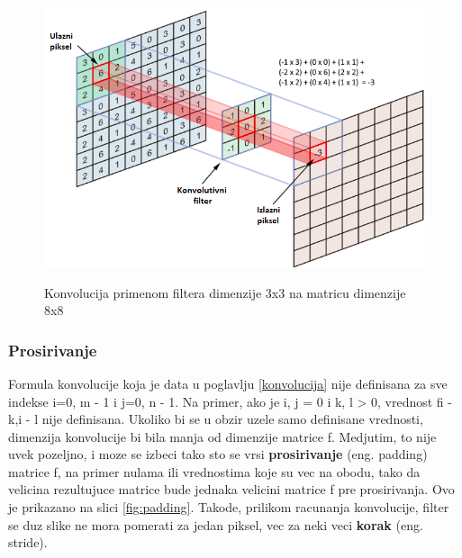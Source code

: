 \documentclass[a4paper]{article}
\begin{document}


\begin{figure}[h!]
\caption{Konvolucija primenom filtera dimenzije 3x3 na matricu dimenzije 8x8}
\centering
\includegraphics[scale=0.9]{convolution.png}
\label{fig:convolution}
\end{figure}

\subsubsection{Prosirivanje}

Formula konvolucije koja je data u poglavlju \ref{konvolucija} nije definisana za sve indekse i=0, m - 1 i j=0, n - 1. Na primer, ako je i, j = 0 i k, l > 0, vrednost fi - k,i - l nije definisana. Ukoliko bi se u obzir uzele samo definisane vrednosti, dimenzija konvolucije bi bila manja od dimenzije matrice f. Medjutim, to nije uvek pozeljno, i moze se izbeci tako sto se vrsi \textbf{prosirivanje} (eng. padding) matrice f, na primer nulama ili vrednostima koje su vec na obodu, tako da velicina rezultujuce matrice bude jednaka velicini matrice f pre prosirivanja. Ovo je prikazano na slici \ref{fig:padding}. Takode, prilikom racunanja konvolucije, filter se duz slike ne mora pomerati za jedan piksel, vec za neki veci \textbf{ korak} (eng. stride).
\end{document}

